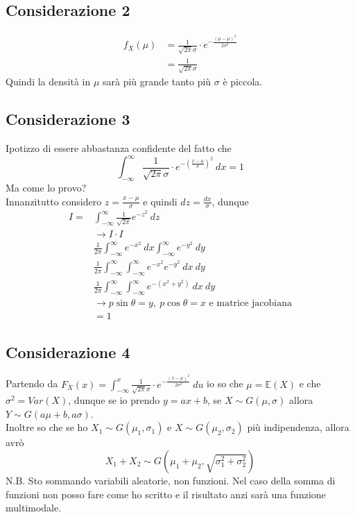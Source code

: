 \documentclass[11pt]{report}
\begin{document}
\subsection{Considerazione 2}
\begin{equation}
    \begin{split}
        f_X(\mu) & = \frac{1}{\sqrt{2\pi}\sigma} \cdot e^{-\frac{(\mu-\mu)^2}{2\sigma^2}}\\
        & = \frac{1}{\sqrt{2\pi}\sigma}
    \end{split}
\end{equation}
Quindi la densità in $\mu$ sarà più grande tanto più $\sigma$ è piccola.
\subsection{Considerazione 3}
Ipotizzo di essere abbastanza confidente del fatto che
\begin{equation}
    \int_{-\infty}^\infty \frac{1}{\sqrt{2\pi}\sigma} \cdot e^{-\left( \frac{x-\mu}{\sigma} \right)^2}\ dx = 1
\end{equation}
Ma come lo provo?\\
Innanzitutto  considero $z = \frac{x-\mu}{\sigma}$ e quindi $dz = \frac{dx}{\sigma}$, dunque
\begin{equation}
    \begin{split}
        I = & \int_{-\infty}^\infty \frac{1}{\sqrt{2\pi}} e^{-z^2}\ dz\\
        &\rightarrow I \cdot I\\
        & \frac{1}{2\pi} \int_{-\infty}^\infty e^{-x^2}\ dx \int_{-\infty}^\infty e^{-y^2}\ dy\\
        & \frac{1}{2\pi} \int_{-\infty}^\infty \int_{-\infty}^\infty e^{-x^2} e^{-y^2}\ dx\ dy\\
        & \frac{1}{2\pi} \int_{-\infty}^\infty \int_{-\infty}^\infty e^{-(x^2+y^2)}\ dx\ dy\\
        & \rightarrow p\sin\theta = y,\ p\cos\theta = x \text{ e matrice jacobiana}\\
        & = 1
    \end{split}
\end{equation}
\subsection{Considerazione 4}
Partendo da $F_X(x) = \int_{-\infty}^x \frac{1}{\sqrt{2\pi}\sigma} \cdot e^{-\frac{(x-\mu)^2}{2\sigma^2}}\ du$ io so che $\mu = \mathbb{E}(X)$ e che $\sigma^2 = Var(X)$, dunque se io prendo $y = ax + b$, se $X \sim G(\mu,\sigma)$ allora $Y \sim G(a\mu+b, a\sigma)$.\\
Inoltre so che se ho $X_1 \sim G(\mu_1, \sigma_1)$ e $X \sim G(\mu_2, \sigma_2)$ più indipendenza, allora avrò
\begin{equation}
    X_1 + X_2 \sim G \left( \mu_1+\mu_2, \sqrt{\sigma_1^2+\sigma_2^2} \right)
\end{equation}
N.B. Sto sommando variabili aleatorie, non funzioni. Nel caso della somma di funzioni non posso fare come ho scritto e il risultato anzi sarà una funzione multimodale.
\end{document}

